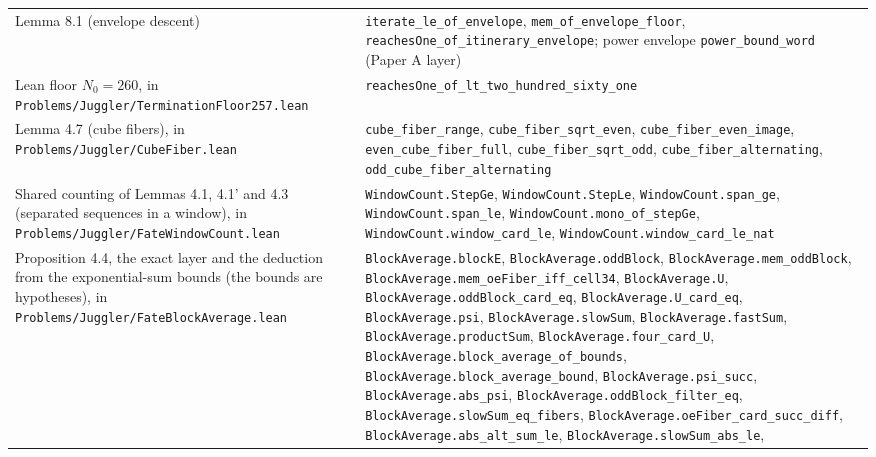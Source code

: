 \documentclass[11pt,a4paper]{article}
\begin{document}
\begin{longtable}[]{@{}
  >{\raggedright\arraybackslash}p{}
  >{\raggedright\arraybackslash}p{}@{}}
Lemma 8.1 (envelope descent) &
\texttt{\nolinkurl{iterate_le_of_envelope}},
\texttt{\nolinkurl{mem_of_envelope_floor}},
\texttt{\nolinkurl{reachesOne_of_itinerary_envelope}}; power envelope
\texttt{\nolinkurl{power_bound_word}} (Paper A layer) \\
Lean floor \(N_0=260\), in
\texttt{\nolinkurl{Problems/Juggler/TerminationFloor257.lean}} &
\texttt{\nolinkurl{reachesOne_of_lt_two_hundred_sixty_one}} \\
Lemma 4.7 (cube fibers), in
\texttt{\nolinkurl{Problems/Juggler/CubeFiber.lean}} &
\texttt{\nolinkurl{cube_fiber_range}},
\texttt{\nolinkurl{cube_fiber_sqrt_even}},
\texttt{\nolinkurl{cube_fiber_even_image}},
\texttt{\nolinkurl{even_cube_fiber_full}},
\texttt{\nolinkurl{cube_fiber_sqrt_odd}},
\texttt{\nolinkurl{cube_fiber_alternating}},
\texttt{\nolinkurl{odd_cube_fiber_alternating}} \\
Shared counting of Lemmas 4.1, 4.1' and 4.3 (separated sequences in a
window), in \texttt{\nolinkurl{Problems/Juggler/FateWindowCount.lean}} &
\texttt{\nolinkurl{WindowCount.StepGe}},
\texttt{\nolinkurl{WindowCount.StepLe}},
\texttt{\nolinkurl{WindowCount.span_ge}},
\texttt{\nolinkurl{WindowCount.span_le}},
\texttt{\nolinkurl{WindowCount.mono_of_stepGe}},
\texttt{\nolinkurl{WindowCount.window_card_le}},
\texttt{\nolinkurl{WindowCount.window_card_le_nat}} \\
Proposition 4.4, the exact layer and the deduction from the
exponential-sum bounds (the bounds are hypotheses), in
\texttt{\nolinkurl{Problems/Juggler/FateBlockAverage.lean}} &
\texttt{\nolinkurl{BlockAverage.blockE}},
\texttt{\nolinkurl{BlockAverage.oddBlock}},
\texttt{\nolinkurl{BlockAverage.mem_oddBlock}},
\texttt{\nolinkurl{BlockAverage.mem_oeFiber_iff_cell34}},
\texttt{\nolinkurl{BlockAverage.U}},
\texttt{\nolinkurl{BlockAverage.oddBlock_card_eq}},
\texttt{\nolinkurl{BlockAverage.U_card_eq}},
\texttt{\nolinkurl{BlockAverage.psi}},
\texttt{\nolinkurl{BlockAverage.slowSum}},
\texttt{\nolinkurl{BlockAverage.fastSum}},
\texttt{\nolinkurl{BlockAverage.productSum}},
\texttt{\nolinkurl{BlockAverage.four_card_U}},
\texttt{\nolinkurl{BlockAverage.block_average_of_bounds}},
\texttt{\nolinkurl{BlockAverage.block_average_bound}},
\texttt{\nolinkurl{BlockAverage.psi_succ}},
\texttt{\nolinkurl{BlockAverage.abs_psi}},
\texttt{\nolinkurl{BlockAverage.oddBlock_filter_eq}},
\texttt{\nolinkurl{BlockAverage.slowSum_eq_fibers}},
\texttt{\nolinkurl{BlockAverage.oeFiber_card_succ_diff}},
\texttt{\nolinkurl{BlockAverage.abs_alt_sum_le}},
\texttt{\nolinkurl{BlockAverage.slowSum_abs_le}},

\end{longtable}
\end{document}
